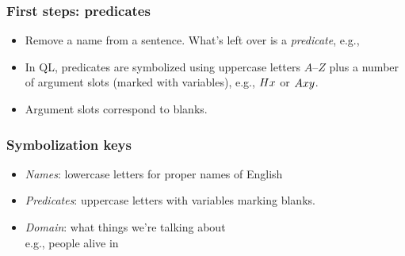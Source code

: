 \begin{frame}
  \frametitle{First steps: predicates}

  \begin{itemize}[<+->]
    \item Remove a name from a sentence. What's left over is a \emph{predicate}, e.g.,\\
    \item In QL, predicates are symbolized using uppercase letters
    $A$--$Z$ plus a number of argument slots (marked with variables),
    e.g., $Hx$ or $Axy$.
    \item Argument slots correspond to blanks.
  \end{itemize}
\end{frame}

\begin{frame}
  \frametitle{Symbolization keys}

  \begin{itemize}[<+->]
    \item \emph{Names}: lowercase letters for proper names of English
    \item \emph{Predicates}: uppercase letters with variables marking
    blanks.
    \item \emph{Domain}: what things we're talking about\\
    e.g., people alive in \year{}
  \end{itemize}
\end{frame}

